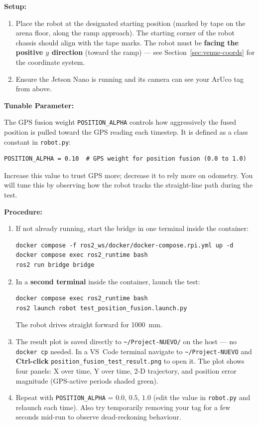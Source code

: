 \documentclass[12pt,letterpaper]{article}
\begin{document}
\textbf{Setup:}
\begin{enumerate}
  \item Place the robot at the designated starting position
        (marked by tape on the arena floor, along the ramp approach).
        The starting corner of the robot chassis should align with the tape
        marks.  The robot must be \textbf{facing the positive $y$ direction}
        (toward the ramp) --- see Section~\ref{sec:venue-coords} for the
        coordinate system.
  \item Ensure the Jetson Nano is running and its camera can see your ArUco
        tag from above.
\end{enumerate}

\textbf{Tunable Parameter:}

The GPS fusion weight \texttt{POSITION\_ALPHA} controls how aggressively the
fused position is pulled toward the GPS reading each timestep.
It is defined as a class constant in \texttt{robot.py}:
\begin{lstlisting}[style=python, caption={POSITION\_ALPHA in robot.py}]
POSITION_ALPHA = 0.10  # GPS weight for position fusion (0.0 to 1.0)
\end{lstlisting}
Increase this value to trust GPS more; decrease it to rely more on odometry.
You will tune this by observing how the robot tracks the straight-line path
during the test.

\textbf{Procedure:}
\begin{enumerate}
  \item If not already running, start the bridge in one terminal inside the
        container:
\begin{lstlisting}[style=bash]
docker compose -f ros2_ws/docker/docker-compose.rpi.yml up -d
docker compose exec ros2_runtime bash
ros2 run bridge bridge
\end{lstlisting}
  \item In a \textbf{second terminal} inside the container, launch the test:
\begin{lstlisting}[style=bash]
docker compose exec ros2_runtime bash
ros2 launch robot test_position_fusion.launch.py
\end{lstlisting}
        The robot drives straight forward for 1000~mm.
  \item The result plot is saved directly to \texttt{\textasciitilde/Project-NUEVO/}
        on the host --- no \texttt{docker cp} needed.
        In a VS~Code terminal navigate to \texttt{\textasciitilde/Project-NUEVO}
        and \textbf{Ctrl-click}
        \texttt{position\_fusion\_test\_result.png} to open it.
        The plot shows four panels: X over time, Y over time, 2-D trajectory,
        and position error magnitude (GPS-active periods shaded green).
  \item Repeat with \texttt{POSITION\_ALPHA} = $0.0$, $0.5$, $1.0$ (edit the
        value in \texttt{robot.py} and relaunch each time).
        Also try temporarily removing your tag for a
        few seconds mid-run to observe dead-reckoning behaviour.
\end{enumerate}
\end{document}
